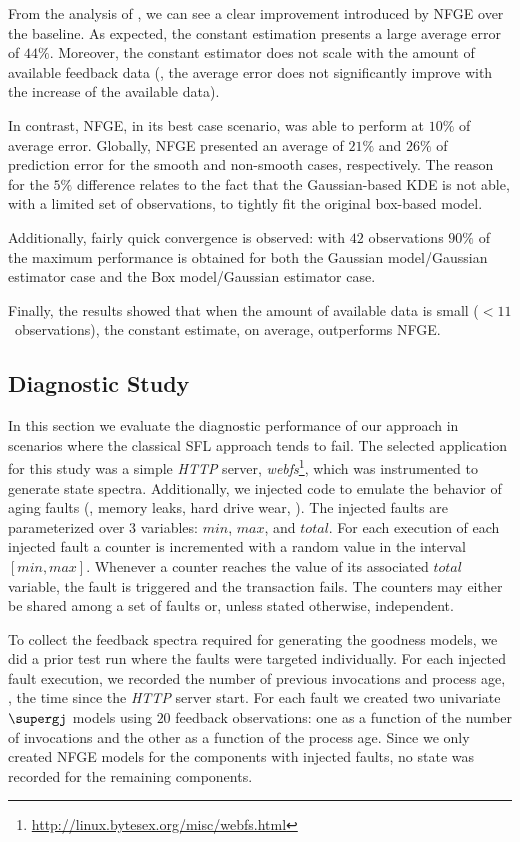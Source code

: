 From the analysis of , we can see a
clear improvement introduced by \ac{NFGE} over the baseline.
%
As expected, the constant estimation presents a large average error of
$44\%$.
%
Moreover, the constant estimator does not scale with the amount of
available feedback data (\ie, the average error does not significantly
improve with the increase of the available data).

In contrast, \ac{NFGE}, in its best case scenario, was able to perform
at $10\%$ of average error.
%
Globally, \ac{NFGE} presented an average of $21\%$ and $26\%$ of
prediction error for the smooth and non-smooth cases, respectively.
%
The reason for the $5\%$ difference relates to the fact that the
Gaussian-based \ac{KDE} is not able, with a limited set of
observations, to tightly fit the original box-based model.

Additionally, fairly quick convergence is observed: with $42$
observations $90\%$ of the maximum performance is obtained for both
the Gaussian model/Gaussian estimator case and the Box model/Gaussian
estimator case.

Finally, the results showed that when the amount of available data is
small ($<11$~observations), the constant estimate, on average,
outperforms \ac{NFGE}.

\subsection{Diagnostic Study}
\label{sec:nfge:benchmark:diagnostic}
In this section we evaluate the diagnostic performance of our approach
in scenarios where the classical \ac{SFL} approach tends to fail.
%
The selected application for this study was a simple \textit{HTTP}
server,
\textit{webfs}\footnote{\url{http://linux.bytesex.org/misc/webfs.html}},
which was instrumented to generate state spectra.
%
Additionally, we injected code to emulate the behavior of aging
faults (\eg, memory leaks, hard drive wear, \etc).
%
The injected faults are parameterized over $3$ variables:
$\mathit{min}$, $\mathit{max}$, and $\mathit{total}$.
%
For each execution of each injected fault a counter is incremented
with a random value in the interval $[\mathit{min}, \mathit{max}]$.
%
Whenever a counter reaches the value of its associated
$\mathit{total}$ variable, the fault is triggered and the transaction
fails.
%
The counters may either be shared among a set of faults or, unless
stated otherwise, independent.

To collect the feedback spectra required for generating the goodness
models, we did a prior test run where the faults were targeted
individually.
%
For each injected fault execution, we recorded the number of previous
invocations and process age, \ie, the time since the \textit{HTTP}
server start.
%
For each fault we created two univariate $\supergj$ models using $20$
feedback observations: one as a function of the number of invocations
and the other as a function of the process age.
%
Since we only created \ac{NFGE} models for the components with
injected faults, no state was recorded for the remaining components.

